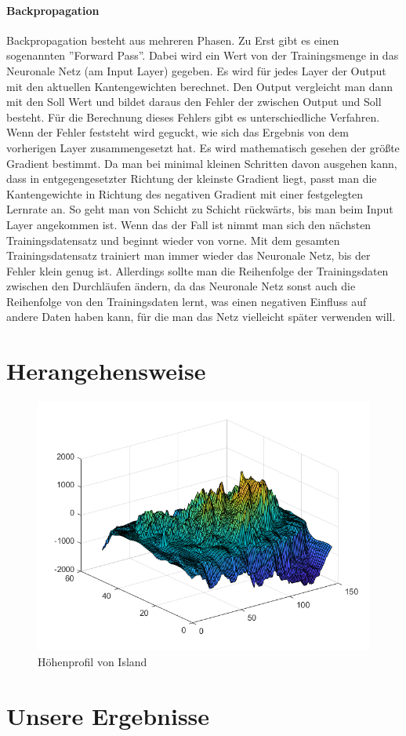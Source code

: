 \documentclass{hbrs-ecta-report}
\begin{document}
\paragraph{Backpropagation}
Backpropagation besteht aus mehreren Phasen. Zu Erst gibt es einen sogenannten ''Forward Pass''. Dabei wird ein Wert von der Trainingsmenge in das Neuronale Netz (am Input Layer) gegeben. Es wird für jedes Layer der Output mit den aktuellen Kantengewichten berechnet. Den Output vergleicht man dann mit den Soll Wert und bildet daraus den Fehler der zwischen Output und Soll besteht. Für die Berechnung dieses Fehlers gibt es unterschiedliche Verfahren. \\
Wenn der Fehler feststeht wird geguckt, wie sich das Ergebnis von dem vorherigen Layer zusammengesetzt hat. Es wird mathematisch gesehen der größte Gradient bestimmt. Da man bei minimal kleinen Schritten davon ausgehen kann, dass in entgegengesetzter Richtung der kleinste Gradient liegt, passt man die Kantengewichte in Richtung des negativen Gradient mit einer festgelegten Lernrate an. So geht man von Schicht zu Schicht rückwärts, bis man beim Input Layer angekommen ist.
Wenn das der Fall ist nimmt man sich den nächsten Trainingsdatensatz und beginnt wieder von vorne. Mit dem gesamten Trainingsdatensatz trainiert man immer wieder das Neuronale Netz, bis der Fehler klein genug ist. Allerdings sollte man die Reihenfolge der Trainingsdaten zwischen den Durchläufen ändern, da das Neuronale Netz sonst auch die Reihenfolge von den Trainingsdaten lernt, was einen negativen Einfluss auf andere Daten haben kann, für die man das Netz vielleicht später verwenden will.



\FloatBarrier

\section{Herangehensweise}
 
\begin{figure}[h!]
	\includegraphics[width=\linewidth]{img/island}
	\caption{Höhenprofil von Island}
	\label{fig:island}
\end{figure}

\FloatBarrier

\section{Unsere Ergebnisse}
\end{document}
